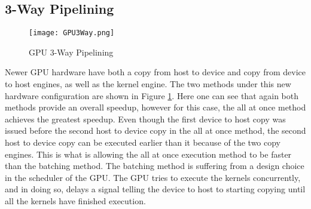 \subsection{3-Way Pipelining}
\begin{figure}[htp]
\centering
\texttt{[image: GPU3Way.png]}
\caption{GPU 3-Way Pipelining}
\label{fig:GPU3Way}
\end{figure}
Newer GPU hardware have both a copy from host to device and copy from device to host engines, as well as the kernel engine. The two methods under this new hardware configuration are shown in Figure \ref{fig:GPU3Way}. Here one can see that again both methods provide an overall speedup, however for this case, the all at once method achieves the greatest speedup. Even though the first device to host copy was issued before the second host to device copy in the all at once method, the second host to device copy can be executed earlier than it because of the two copy engines. This is what is allowing the all at once execution method to be faster than the batching method. The batching method is suffering from a design choice in the scheduler of the GPU. The GPU tries to execute the kernels concurrently, and in doing so, delays a signal telling the device to host to starting copying until all the kernels have finished execution.